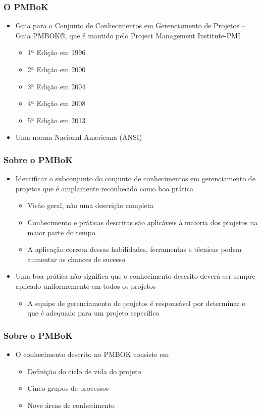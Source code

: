   \begin{frame}
   \frametitle{O PMBoK}
   \begin{itemize}
    \item Guia para o Conjunto de Conhecimentos em Gerenciamento de Projetos – Guia  PMBOK®, que é mantido pelo Project Management Institute-PMI
    \begin{itemize}
     \item 1ª Edição em 1996
     \item 2ª Edição em 2000
     \item 3ª Edição em 2004
     \item 4ª Edição em 2008
     \item 5ª Edição em 2013
    \end{itemize}
  \item Uma norma Nacional Americana (ANSI)
   \end{itemize}
  \end{frame}
  
    \begin{frame}
   \frametitle{Sobre o PMBoK}
   \begin{itemize}
    \item Identificar o subconjunto do conjunto de conhecimentos em gerenciamento de projetos que é amplamente reconhecido como boa prática
    \begin{itemize}
     \item Visão geral, não uma descrição completa
     \item Conhecimento e práticas descritas são aplicáveis à maioria dos projetos na maior parte do tempo
     \item A aplicação correta dessas habilidades, ferramentas e técnicas podem aumentar as chances de sucesso
    \end{itemize}
    \item Uma boa prática não significa que o conhecimento descrito deverá ser sempre aplicado uniformemente em todos os projetos
    \begin{itemize}
     \item A equipe de gerenciamento de projetos é responsável por determinar o que é adequado para um projeto específico
    \end{itemize}
   \end{itemize}
  \end{frame} 	
  
      \begin{frame}
   \frametitle{Sobre o PMBoK}
   \begin{itemize}
    \item O conhecimento descrito no PMBOK consiste em
    \begin{itemize}
     \item Definição do ciclo de vida do projeto
     \item Cinco grupos de processos
     \item Nove áreas de conhecimento
    \end{itemize}
   \end{itemize}
  \end{frame}
  

